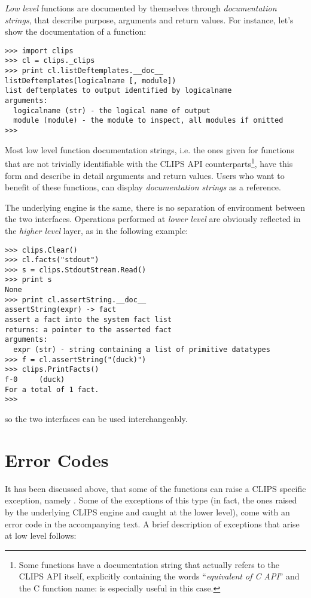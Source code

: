 \emph{Low level} functions are documented by themselves through
\emph{documentation strings}, that describe purpose, arguments and return
values. For instance, let's show the documentation of a function:

\begin{verbatim}
>>> import clips
>>> cl = clips._clips
>>> print cl.listDeftemplates.__doc__
listDeftemplates(logicalname [, module])
list deftemplates to output identified by logicalname
arguments:
  logicalname (str) - the logical name of output
  module (module) - the module to inspect, all modules if omitted
>>>
\end{verbatim}

Most low level function documentation strings, i.e. the ones given
for functions that are not trivially identifiable with the CLIPS API
counterparts\footnote{Some functions have a documentation string that
actually refers to the CLIPS API itself, explicitly containing the words
``\emph{equivalent of C API}'' and the C function name: \clipsapg{} is
especially useful in this case.}, have this form and describe in detail
arguments and return values. Users who want to benefit of these
functions, can display \emph{documentation strings} as a reference.

The underlying engine is the same, there is no separation of environment
between the two interfaces. Operations performed at \emph{lower level}
are obviously reflected in the \emph{higher level} layer, as in the
following example:

\begin{verbatim}
>>> clips.Clear()
>>> cl.facts("stdout")
>>> s = clips.StdoutStream.Read()
>>> print s
None
>>> print cl.assertString.__doc__
assertString(expr) -> fact
assert a fact into the system fact list
returns: a pointer to the asserted fact
arguments:
  expr (str) - string containing a list of primitive datatypes
>>> f = cl.assertString("(duck)")
>>> clips.PrintFacts()
f-0     (duck)
For a total of 1 fact.
>>>
\end{verbatim}

so the two interfaces can be used interchangeably.



\chapter{Error Codes\label{pyclips-errors}}

It has been discussed above, that some of the \pyclips{} functions can
raise a CLIPS specific exception, namely . Some
of the exceptions of this type (in fact, the ones raised by the
underlying CLIPS engine and caught at the lower level), come with an
error code in the accompanying text. A brief description of exceptions
that arise at low level follows:

